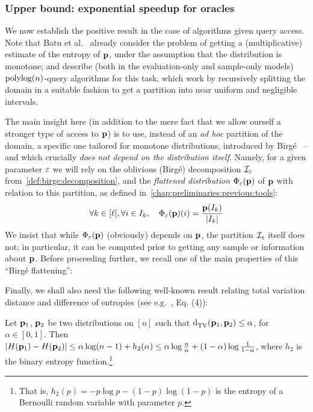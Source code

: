 \subsubsection{Upper bound: exponential speedup for \cdfsamp oracles}
We now establish the positive result in the case of algorithms given \cdfsamp query access. Note that Batu et al.~\cite{BDKR:05} already consider the problem of getting a (multiplicative) estimate of the entropy of $\D$, under the assumption that the distribution is monotone; and describe (both in the evaluation-only and sample-only models) $\poly\!\log(n)$-query algorithms for this task, which work by recursively splitting the domain in a suitable fashion to get a partition into near uniform and negligible intervals.

The main insight here (in addition to the mere fact that we allow ourself a stronger type of access to $\D$) is to use, instead of an \emph{ad hoc} partition of the domain, a specific one tailored for monotone distributions, introduced by Birg\'e~\cite{Birge:87} -- and which crucially \emph{does not depend on the distribution itself}. Namely, for a given parameter $\eps$ we will rely on the oblivious (Birg\'e) decomposition $\mathcal{I}_\eps$ from~\cref{def:birge:decomposition}, and the \emph{flattened distribution} $\birge[\D]{\eps}$ of $\D$ with relation to this partition, as defined in~\cref{chap:preliminaries:previous:tools}:
\[ \forall k\in [\ell], \forall i\in I_k,\quad \birge[\D]{\eps}(i) = \frac{\D(I_k)}{\abs{I_k}} \]
We insist that while $\birge[\D]{\eps}$ (obviously) depends on $\D$, the partition $\mathcal{I}_\eps$ itself does not; in particular, it can be computed prior to getting any sample or information about $\D$. Before proceeding further, we recall one of the main properties of this ``Birg\'e flattening'':

\birgerobustcorollary*

Finally, we shall also need the following well-known result relating total variation distance and difference of entropies (see e.g.~\cite{Zhang:07}, Eq. (4)):
\begin{fact}\label{fact:tv:entropy}
Let $\D_1$, $\D_2$ be two distributions on $[n]$ such that $\totalvardist{\D_1}{\D_2} \leq \alpha$, for $\alpha\in[0,1]$. Then $\abs{H(\D_1)-H(\D_2)} \leq \alpha\log(n-1) +h_2(\alpha) \leq \alpha\log\frac{n}{\alpha} + (1-\alpha)\log\frac{1}{1-\alpha}$, where $h_2$ is the binary entropy function.\footnote{That is, $h_2(p)=-p\log p - (1-p)\log(1-p)$ is the entropy of a Bernoulli random variable with parameter $p$.}
\end{fact}

